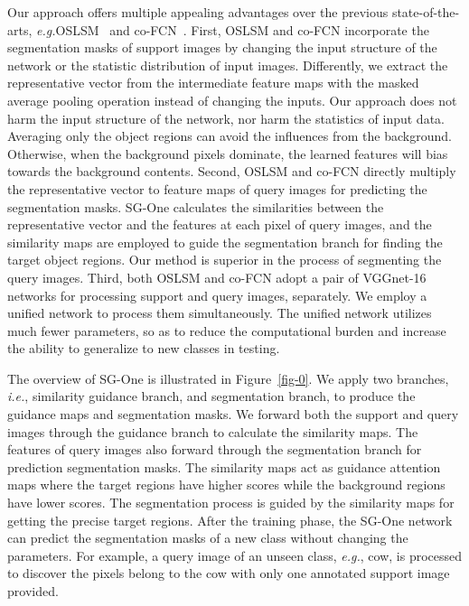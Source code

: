 \documentclass[journal]{IEEEtran}
\newcommand{\eg}{\emph{e.g.}}
\newcommand{\ie}{\emph{i.e.}}
\begin{document}
Our approach offers multiple appealing advantages over the previous state-of-the-arts, \eg OSLSM~\cite{shaban2017one} and co-FCN~\cite{rakelly2018conditional}.
First, OSLSM and co-FCN incorporate the segmentation masks of support images by changing the input structure of the network or the statistic distribution of input images.
Differently, we extract the representative vector from the intermediate feature maps with the masked average pooling operation instead of changing the inputs.
Our approach does not harm the input structure of the network, nor harm the statistics of input data. 
Averaging only the object regions can avoid the influences from the background.
Otherwise, when the background pixels dominate, the learned features will bias towards the background contents.
Second, OSLSM and co-FCN directly multiply the representative vector to feature maps of query images for predicting the segmentation masks.
SG-One calculates the similarities between the representative vector and the features at each pixel of query images, and the similarity maps are employed to guide the segmentation branch for finding the target object regions.
Our method is superior in the process of segmenting the query images. 
Third, both OSLSM and co-FCN adopt a pair of VGGnet-16 networks for processing support and query images, separately.
We employ a unified network to process them simultaneously.
The unified network utilizes much fewer parameters, so as to reduce the computational burden and increase the ability to generalize to new classes in testing.

The overview of SG-One is illustrated in Figure~\ref{fig-0}. 
We apply two branches, \ie, similarity guidance branch, and segmentation branch, to produce the guidance maps and segmentation masks.
We forward both the support and query images through the guidance branch to calculate the similarity maps.
The features of query images also forward through the segmentation branch for prediction segmentation masks.
The similarity maps act as guidance attention maps where the target regions have higher scores while the background regions have lower scores.
The segmentation process is guided by the similarity maps for getting the precise target regions.
After the training phase, the SG-One network can predict the segmentation masks of a new class without changing the parameters. 
For example, a query image of an unseen class, \eg, cow, is processed to discover the pixels belong to the cow with only one annotated support image provided.
\end{document}
